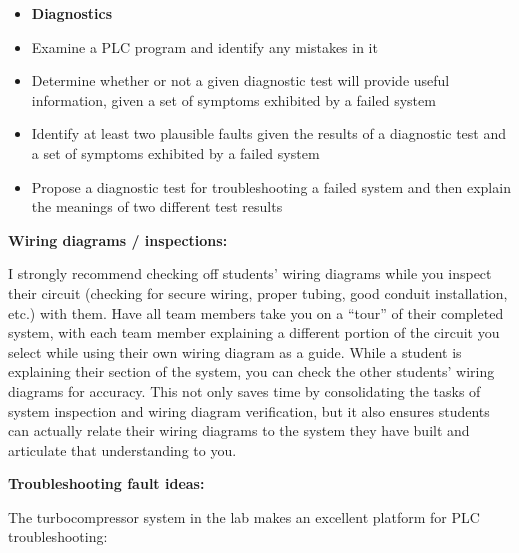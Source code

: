 \begin{itemize}
\filbreak

\begin{itemize}
\item{} {\bf Diagnostics}
\item{} Examine a PLC program and identify any mistakes in it
\item{} Determine whether or not a given diagnostic test will provide useful information, given a set of symptoms exhibited by a failed system
\item{} Identify at least two plausible faults given the results of a diagnostic test and a set of symptoms exhibited by a failed system
\item{} Propose a diagnostic test for troubleshooting a failed system and then explain the meanings of two different test results
\end{itemize}















\noindent
{\bf Wiring diagrams / inspections:}

I strongly recommend checking off students' wiring diagrams while you inspect their circuit (checking for secure wiring, proper tubing, good conduit installation, etc.) with them.  Have all team members take you on a ``tour'' of their completed system, with each team member explaining a different portion of the circuit you select while using their own wiring diagram as a guide.  While a student is explaining their section of the system, you can check the other students' wiring diagrams for accuracy.  This not only saves time by consolidating the tasks of system inspection and wiring diagram verification, but it also ensures students can actually relate their wiring diagrams to the system they have built and articulate that understanding to you.

\vskip 10pt

\goodbreak

\noindent
{\bf Troubleshooting fault ideas:}

The turbocompressor system in the lab makes an excellent platform for PLC troubleshooting:


\end{itemize}
